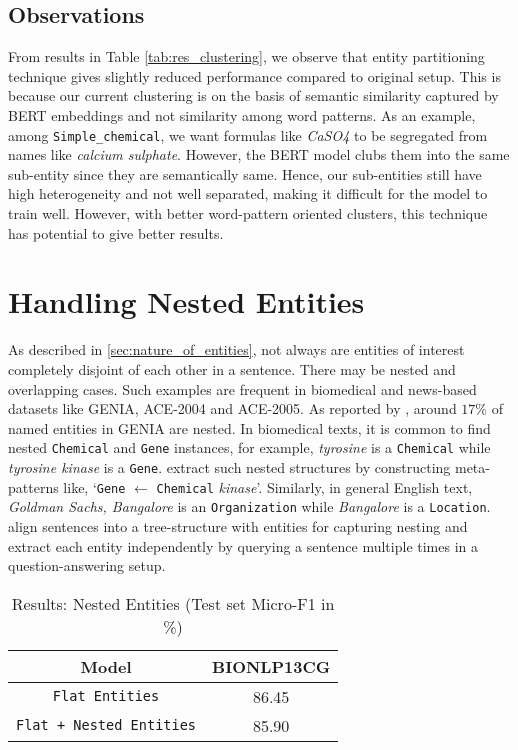 \subsection{Observations}
From results in Table \ref{tab:res_clustering}, we observe that entity partitioning technique gives slightly reduced performance compared to original setup. This is because our current clustering is on the basis of semantic similarity captured by BERT embeddings and not similarity among word patterns. As an example, among \texttt{Simple\_chemical}, we want formulas like \textit{CaSO4} to be segregated from names like \textit{calcium sulphate}. However, the BERT model clubs them into the same sub-entity since they are semantically same. Hence, our sub-entities still have high heterogeneity and not well separated, making it difficult for the model to train well. However, with better word-pattern oriented clusters, this technique has potential to give better results.

\section{Handling Nested Entities}

As described in \ref{sec:nature_of_entities}, not always are entities of interest completely disjoint of each other in a sentence. There may be nested and overlapping cases. Such examples are frequent in biomedical and news-based datasets like GENIA\cite{kim2003genia}, ACE-2004\cite{mitchell2005ace} and ACE-2005\cite{walker2006ace}. As reported by \cite{finkel2009nested}, around $17\%$ of named entities in GENIA are nested. In biomedical texts, it is common to find nested \texttt{Chemical} and \texttt{Gene} instances, for example, \textit{tyrosine} is a \texttt{Chemical} while \textit{tyrosine kinase} is a \texttt{Gene}. \cite{wang2018penner} extract such nested structures by constructing meta-patterns like, `\texttt{Gene} $\leftarrow$ \texttt{Chemical} \textit{kinase}'. Similarly, in general English text, \textit{Goldman Sachs, Bangalore} is an \texttt{Organization} while \textit{Bangalore} is a \texttt{Location}. \cite{finkel2009nested} align sentences into a tree-structure with entities for capturing nesting and \cite{li2019unified} extract each entity independently by querying a sentence multiple times in a question-answering setup. 

\begin{table}[h!]
\centering
\begin{tabular}{|c|c|}\hline
	\textbf{Model} & \textbf{BIONLP13CG}\\\hline
	\texttt{Flat Entities} & 86.45\\\hline
	\texttt{Flat + Nested Entities} & 85.90\\\hline
	\end{tabular}
    \caption{Results: Nested Entities (Test set Micro-F1 in \%)}
    \label{tab:res_nesting}
\end{table}

